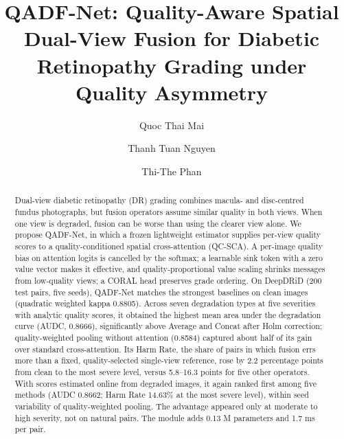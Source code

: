 \documentclass[final,5p,times,twocolumn,authoryear]{elsarticle}
\theoremstyle{plain}
\theoremstyle{remark}
\begin{document}

\begin{frontmatter}

\title{QADF-Net: Quality-Aware Spatial Dual-View Fusion for Diabetic
  Retinopathy Grading under Quality Asymmetry}

\author[a1]{Quoc Thai Mai}
\author[a1]{Thanh Tuan Nguyen}
\author[a1]{Thi-The Phan}



\begin{abstract}
Dual-view diabetic retinopathy (DR) grading combines macula- and disc-centred fundus photographs, but fusion operators assume similar quality in both views. When one view is degraded, fusion can be worse than using the clearer view alone. We propose QADF-Net, in which a frozen lightweight estimator supplies per-view quality scores to a quality-conditioned spatial cross-attention (QC-SCA). A per-image quality bias on attention logits is cancelled by the softmax; a learnable sink token with a zero value vector makes it effective, and quality-proportional value scaling shrinks messages from low-quality views; a CORAL head preserves grade ordering. On DeepDRiD (200 test pairs, five seeds), QADF-Net matches the strongest baselines on clean images (quadratic weighted kappa 0.8805). Across seven degradation types at five severities with analytic quality scores, it obtained the highest mean area under the degradation curve (AUDC, 0.8666), significantly above Average and Concat after Holm correction; quality-weighted pooling without attention (0.8584) captured about half of its gain over standard cross-attention. Its Harm Rate, the share of pairs in which fusion errs more than a fixed, quality-selected single-view reference, rose by 2.2 percentage points from clean to the most severe level, versus 5.8--16.3 points for five other operators. With scores estimated online from degraded images, it again ranked first among five methods (AUDC 0.8662; Harm Rate 14.63\% at the most severe level), within seed variability of quality-weighted pooling. The advantage appeared only at moderate to high severity, not on natural pairs. The module adds 0.13 M parameters and 1.7 ms per pair.
\end{abstract}


\end{frontmatter}
\end{document}
